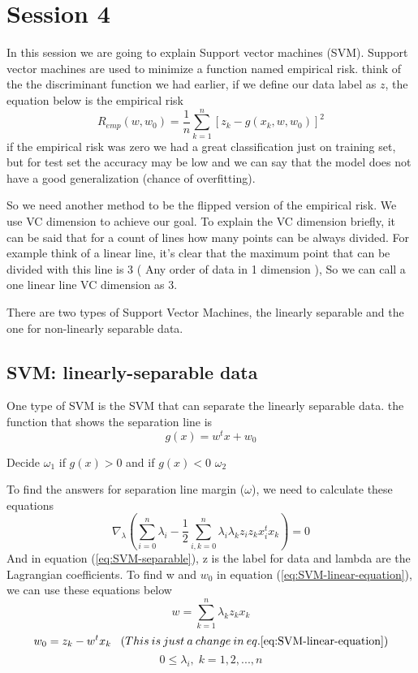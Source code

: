 \documentclass{article}
\begin{document}
\section{Session 4}
In this session we are going to explain Support vector machines (SVM). Support vector machines are used to minimize a function named empirical risk. think of the the discriminant function we had earlier, if we define our data label as $z$, the equation below is the empirical risk
\begin{equation}
    R_{emp}(w, w_0) = \frac{1}{n} \sum_{k=1}^{n} [z_k - g(x_k, w, w_0)]^2
\end{equation}
if the empirical risk was zero we had a great classification just on training set, but for test set the accuracy may be low and we can say that the model does not have a good generalization (chance of overfitting). \par
So we need another method to be the flipped version of the empirical risk. We use VC dimension to achieve our goal. To explain the VC dimension briefly, it can be said that for a count of lines how many points can be always divided. For example think of a linear line, it's clear that the maximum point that can be divided with this line is 3 ( Any order of data in 1 dimension ), So we can call a one linear line VC dimension as 3.

There are two types of Support Vector Machines, the linearly separable and the one for non-linearly separable data.
\subsection{SVM: linearly-separable data}
One type of SVM is the SVM that can separate the linearly separable data. the function that shows the separation line is 
\begin{equation} \label{eq:SVM-linear-equation}
    g(x) = w^t x + w_0
\end{equation}
\begin{center}
    \footnotesize{Decide $\omega_1$ if $g(x) > 0$ and if $g(x) < 0$ $\omega_2$}
\end{center}
To find the answers for separation line margin ($\omega$), we need to calculate these equations 
\begin{equation} \label{eq:SVM-separable}
    \nabla_{\lambda} (\sum_{i=0}^{n} \lambda_i - \frac{1}{2} \sum_{i,k = 0}^{n} \lambda_i \lambda_k z_i z_k x_i^t x_k) = 0
\end{equation}
And in equation (\ref{eq:SVM-separable}), z is the label for data and lambda are the Lagrangian coefficients. To find w and $w_0$ in equation (\ref{eq:SVM-linear-equation}), we can use these equations below
\begin{equation}
    w = \sum_{k=1}^{n} \lambda_k z_k x_k
\end{equation}
\begin{equation}
    w_0 = z_k - w^t x_k \; \; \; (This\:is \: just \: a \: change \: in \: eq.\ref{eq:SVM-linear-equation})
\end{equation}
\begin{equation}
    0 \leq \lambda_i, \; k = 1,2,...,n    
\end{equation}
\end{document}
